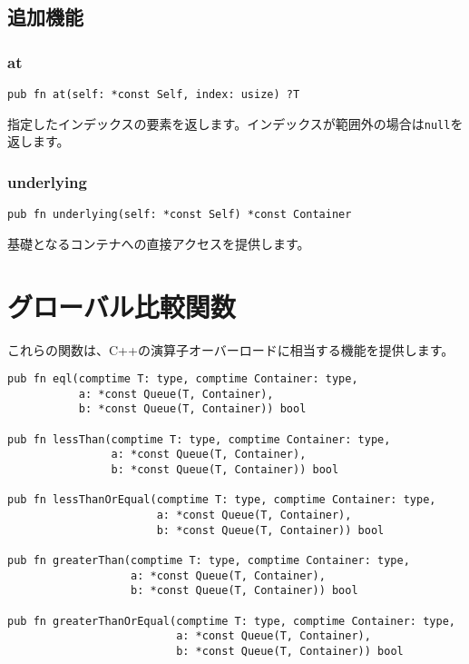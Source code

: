 \documentclass{ltjsarticle}
\begin{document}
\subsection{追加機能}

\subsubsection{at}
\begin{lstlisting}[style=zigstyle]
pub fn at(self: *const Self, index: usize) ?T
\end{lstlisting}
指定したインデックスの要素を返します。インデックスが範囲外の場合は\texttt{null}を返します。

\subsubsection{underlying}
\begin{lstlisting}[style=zigstyle]
pub fn underlying(self: *const Self) *const Container
\end{lstlisting}
基礎となるコンテナへの直接アクセスを提供します。

\section{グローバル比較関数}

これらの関数は、C++の演算子オーバーロードに相当する機能を提供します。

\begin{lstlisting}[style=zigstyle]
pub fn eql(comptime T: type, comptime Container: type, 
           a: *const Queue(T, Container), 
           b: *const Queue(T, Container)) bool

pub fn lessThan(comptime T: type, comptime Container: type, 
                a: *const Queue(T, Container), 
                b: *const Queue(T, Container)) bool

pub fn lessThanOrEqual(comptime T: type, comptime Container: type, 
                       a: *const Queue(T, Container), 
                       b: *const Queue(T, Container)) bool

pub fn greaterThan(comptime T: type, comptime Container: type, 
                   a: *const Queue(T, Container), 
                   b: *const Queue(T, Container)) bool

pub fn greaterThanOrEqual(comptime T: type, comptime Container: type, 
                          a: *const Queue(T, Container), 
                          b: *const Queue(T, Container)) bool
\end{lstlisting}
\end{document}
